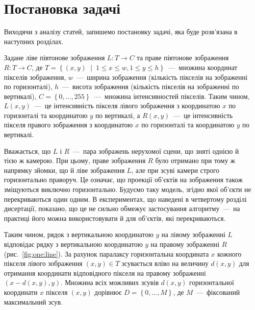 \section{Постановка задачі}

Виходячи з аналізу статей, запишемо постановку задачі,
яка буде розв'язана в наступних розділах.

Задане ліве півтонове зображення $L : T \to C$
та праве півтонове зображення $R : T \to C$,
де
$T = \left\{
    \left( x, y \right) \; \middle| \; 1 \le x \le w, 1 \le y \le h
\right\}$~---~множина координат пікселів зображення,
$w$~---~ширина зображення (кількість пікселів на зображенні по горизонталі),
$h$~---~висота зображення (кількість пікселів на зображенні по вертикалі),
$C = \left\{ 0, \dotsc, 255 \right\} $~---~множина інтенсивностей пікселів.
Таким чином,
$L \left(x, y \right)$~---~це інтенсивність пікселя лівого зображення
з координатою $x$ по горизонталі та координатою $y$ по вертикалі,
а $R \left( x, y \right)$~---~це інтенсивність пікселя правого зображення
з координатою $x$ по горизонталі та координатою $y$ по вертикалі.

Вважається, що $L$ і $R$~---~пара зображень нерухомої сцени,
що зняті однією й тією ж камерою.
При цьому, праве зображення $R$ було отримано при тому ж напрямку зйомки,
що й ліве зображення $L$, але при зсуві камери строго горизонтально праворуч.
Це означає,
що проекції об'єктів на зображення також зміщуються виключно горизонтально.
Будуємо таку модель, згідно якої об'єкти не перекриваються один одним.
В експериментах, що наведені в четвертому розділі дисертації, показано,
що це не сильно обмежує застосування алгоритму~---~на практиці його можна
використовувати й для об'єктів, які перекриваються.

Таким чином, рядок з вертикальною координатою $y$
на лівому зображенні $L$ відповідає
рядку з вертикальною координатою $y$ на правому зображенні $R$
(рис.~\ref{fig:one:line}).
За рахунок паралаксу горизонтальна координата $x$
кожного пікселя лівого зображення $\left( x, y \right) \in T$
зсувається вліво на величину $d \left(x, y \right) $
для отримання координати відповідного пікселя на правому зображенні
$\left( x - d \left(x, y \right), y \right)$.
Множина всіх можливих зсувів $d \left(x, y \right)$
горизонтальної координати $x$ пікселя $\left(x, y \right)$ дорівнює
$D = \left\{ 0, \dotsc, M \right\}$, де $M$~---~фіксований максимальний зсув.

